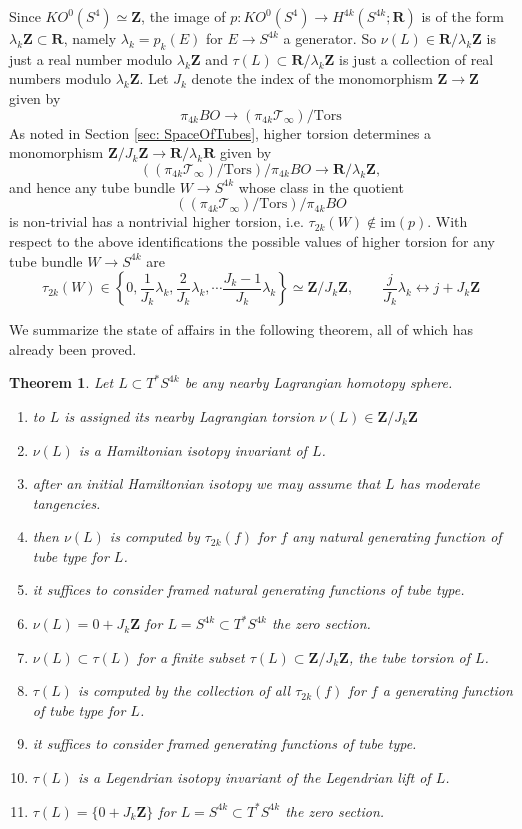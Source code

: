 \documentclass{amsart}
\newcommand\cT{\mathcal{T}}
\def\bR{\mathbf{R}}
\def\bZ{\mathbf{Z}}
\newtheorem{theorem}{Theorem}[section]
\theoremstyle{definition}
\theoremstyle{remark}
\newtheorem{inductive lemma}[theorem]{Inductive Lemma}
\begin{document}
Since $KO^0(S^4) \simeq \bZ$, the image of $p:KO^0(S^4) \to H^{4k}(S^{4k};\bR)$ is of the form $\lambda_k \bZ \subset \bR$, namely $\lambda_k=p_k(E)$ for $E \to S^{4k}$ a generator. So $\nu(L) \in \bR/\lambda_k \bZ$ is just a real number modulo $\lambda_k \bZ$ and $\tau(L) \subset \bR/\lambda_k \bZ$ is just a collection of real numbers modulo $\lambda_k \bZ$. Let $J_k$ denote the index of the monomorphism $\bZ \to \bZ$ given by
$$ \pi_{4k} BO  \to (\pi_{4k} \cT_\infty )/ \text{Tors}  $$
As noted in Section \ref{sec: SpaceOfTubes}, higher torsion determines a monomorphism $ \bZ/J_k \bZ \to \bR / \lambda_k \bR $ given by
$$ \left (( \pi_{4k} \cT_\infty) / \text{Tors}  \right) /  \pi_{4k} BO  \to \bR/\lambda_k \bZ ,$$
and hence any tube bundle $W \to S^{4k}$ whose class in the quotient 
$$  \left ( (\pi_{4k} \cT_\infty) / \text{Tors}  \right) /  \pi_{4k} BO    $$
is non-trivial has a nontrivial higher torsion, i.e. $\tau_{2k}(W) \not\in \text{im}(p)$. With respect to the above identifications the possible values of higher torsion for any tube bundle $W \to S^{4k}$ are
$$ \tau_{2k}(W) \in \left\{ 0, \frac{1}{J_k} \lambda_k , \frac{2}{J_k} \lambda_k , \cdots \frac{J_k-1}{J_k} \lambda_k  \right\}  \simeq \bZ / J_k \bZ , \qquad  \frac{j}{J_k} \lambda_k \leftrightarrow j+J_k\bZ $$


We summarize the state of affairs in the following theorem, all of which has already been proved.

\begin{theorem} Let $L \subset T^*S^{4k}$ be any nearby Lagrangian homotopy sphere.
\begin{enumerate}
\item to $L$ is assigned its nearby Lagrangian torsion $\nu(L) \in \bZ/J_k\bZ$
\item $\nu(L)$ is a Hamiltonian isotopy invariant of $L$.
\item after an initial Hamiltonian isotopy we may assume that $L$ has moderate tangencies.
\item then $\nu(L)$ is computed by $\tau_{2k}(f)$ for $f$ any natural generating function of tube type for $L$. 
\item it suffices to consider framed natural generating functions of tube type.
\item $\nu(L)=0+J_k \bZ$ for $L=S^{4k} \subset T^*S^{4k}$ the zero section.
\item $\nu(L) \subset \tau(L)$ for a finite subset $\tau(L) \subset \bZ/J_k\bZ$, the tube torsion of $L$.
\item  $\tau(L)$ is computed by the collection of all $\tau_{2k}(f)$ for $f$ a generating function of tube type for $L$. 
\item it suffices to consider framed generating functions of tube type.
\item $\tau(L)$ is a Legendrian isotopy invariant of the Legendrian lift of $L$.
\item $\tau(L)=\{0+J_k \bZ\}$  for $L=S^{4k} \subset T^*S^{4k}$ the zero section.
\end{enumerate}
\end{theorem}
\end{document}
